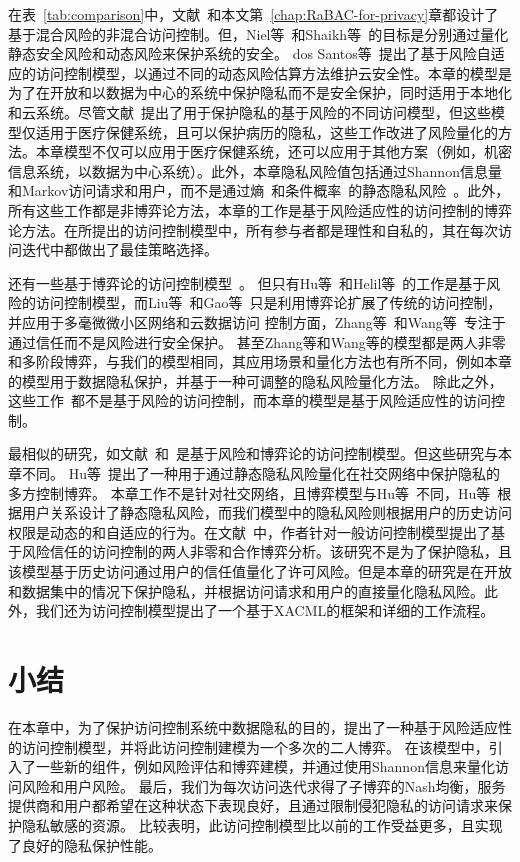 在表~\ref{tab:comparison}中，文献~\cite{ni2010risk,shaikh2012dynamic,santos2016framework,wang2011quantified,zhang2018privacy,zhen2015risk}和本文第~\ref{chap:RaBAC-for-privacy}章都设计了基于混合风险的非混合访问控制。但，Niel等~\cite{ni2010risk}和Shaikh等~\cite{shaikh2012dynamic}的目标是分别通过量化静态安全风险和动态风险来保护系统的安全。 dos Santos等~\cite{santos2016framework}提出了基于风险自适应的访问控制模型，以通过不同的动态风险估算方法维护云安全性。本章的模型是为了在开放和以数据为中心的系统中保护隐私而不是安全保护，同时适用于本地化和云系统。尽管文献~\cite{wang2011quantified,zhen2015risk,zhang2018privacy}提出了用于保护隐私的基于风险的不同访问模型，但这些模型仅适用于医疗保健系统，且可以保护病历的隐私，这些工作改进了风险量化的方法。本章模型不仅可以应用于医疗保健系统，还可以应用于其他方案（例如，机密信息系统，以数据为中心系统）。此外，本章隐私风险值包括通过Shannon信息量和Markov访问请求和用户，而不是通过熵~\cite{zhen2015risk}和条件概率~\cite{zhang2018privacy}的静态隐私风险~\cite{wang2011quantified}。此外，所有这些工作都是非博弈论方法，本章的工作是基于风险适应性的访问控制的博弈论方法。在所提出的访问控制模型中，所有参与者都是理性和自私的，其在每次访问迭代中都做出了最佳策略选择。


还有一些基于博弈论的访问控制模型~\cite{liu2016dynamic,gao2018game,zhang2015towards,wang2019game,hu2014game,helil2017non}。 但只有Hu等~\cite{hu2014game}和Helil等~\cite{helil2017non}的工作是基于风险的访问控制模型，而Liu等~\cite{liu2016dynamic}和Gao等~\cite{gao2018game}只是利用博弈论扩展了传统的访问控制，并应用于多毫微微小区网络和云数据访问 控制方面，Zhang等~\cite{zhang2015towards}和Wang等~\cite{wang2019game}专注于通过信任而不是风险进行安全保护。 甚至Zhang等和Wang等的模型都是两人非零和多阶段博弈，与我们的模型相同，其应用场景和量化方法也有所不同，例如本章的模型用于数据隐私保护，并基于一种可调整的隐私风险量化方法。 除此之外，这些工作~\cite{liu2016dynamic,gao2018game,zhang2015towards,wang2019game}都不是基于风险的访问控制，而本章的模型是基于风险适应性的访问控制。

最相似的研究，如文献~\cite{hu2014game}和~\cite{helil2017non}是基于风险和博弈论的访问控制模型。但这些研究与本章不同。 Hu等~\cite{hu2014game}提出了一种用于通过静态隐私风险量化在社交网络中保护隐私的多方控制博弈。
本章工作不是针对社交网络，且博弈模型与Hu等~\cite{hu2014game}不同，Hu等~\cite{hu2014game}根据用户关系设计了静态隐私风险，而我们模型中的隐私风险则根据用户的历史访问权限是动态的和自适应的行为。在文献~\cite{helil2017non}中，作者针对一般访问控制模型提出了基于风险信任的访问控制的两人非零和合作博弈分析。该研究不是为了保护隐私，且该模型基于历史访问通过用户的信任值量化了许可风险。但是本章的研究是在开放和数据集中的情况下保护隐私，并根据访问请求和用户的直接量化隐私风险。此外，我们还为访问控制模型提出了一个基于XACML的框架和详细的工作流程。

\section{小结}\label{sec:conclusions}

在本章中，为了保护访问控制系统中数据隐私的目的，提出了一种基于风险适应性的访问控制模型，并将此访问控制建模为一个多次的二人博弈。 在该模型中，引入了一些新的组件，例如风险评估和博弈建模，并通过使用Shannon信息来量化访问风险和用户风险。 最后，我们为每次访问迭代求得了子博弈的Nash均衡，服务提供商和用户都希望在这种状态下表现良好，且通过限制侵犯隐私的访问请求来保护隐私敏感的资源。 比较表明，此访问控制模型比以前的工作受益更多，且实现了良好的隐私保护性能。